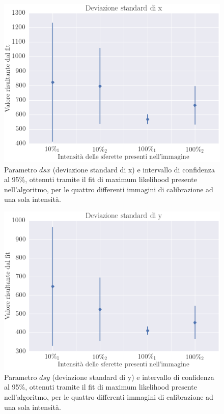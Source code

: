 \begin{figure}
 \centering
 \includegraphics[scale=.50]{img/CAP4dsx.png}
 \caption{\small{Parametro $dsx$ (deviazione standard di x) e intervallo di confidenza al 95\%, ottenuti tramite il fit di maximum likelihood presente nell'algoritmo, per le quattro differenti immagini di calibrazione ad una sola intensità.}}
 \label{fig:dsx}
\end{figure}

\begin{figure}
 \centering
 \includegraphics[scale=.50]{img/CAP4dsy.png}
 \caption{\small{Parametro $dsy$ (deviazione standard di y) e intervallo di confidenza al 95\%, ottenuti tramite il fit di maximum likelihood presente nell'algoritmo, per le quattro differenti immagini di calibrazione ad una sola intensità.}}
 \label{fig:dsy}
\end{figure}

